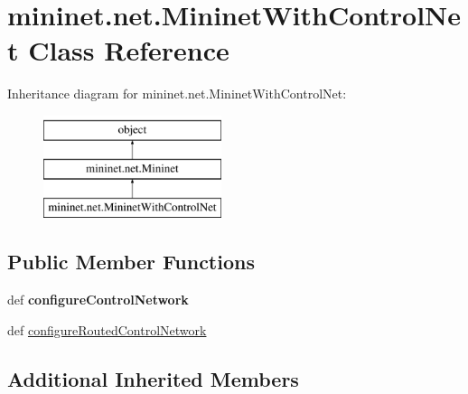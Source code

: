 \hypertarget{classmininet_1_1net_1_1MininetWithControlNet}{\section{mininet.\-net.\-Mininet\-With\-Control\-Net Class Reference}
\label{classmininet_1_1net_1_1MininetWithControlNet}
}
Inheritance diagram for mininet.\-net.\-Mininet\-With\-Control\-Net\-:\begin{figure}[H]
\begin{center}
\leavevmode
\includegraphics[height=3.000000cm]{classmininet_1_1net_1_1MininetWithControlNet}
\end{center}
\end{figure}
\subsection*{Public Member Functions}
\begin{DoxyCompactItemize}
\item 
\hypertarget{classmininet_1_1net_1_1MininetWithControlNet_ada8e763cc2bb869884a9aec47fed0a15}{def {\bfseries configure\-Control\-Network}}\label{classmininet_1_1net_1_1MininetWithControlNet_ada8e763cc2bb869884a9aec47fed0a15}

\item 
def \hyperlink{classmininet_1_1net_1_1MininetWithControlNet_a09954c5fd8df2f567db97839d2b03915}{configure\-Routed\-Control\-Network}
\end{DoxyCompactItemize}
\subsection*{Additional Inherited Members}


